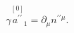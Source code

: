 \begin{equation}
\gamma \stackrel{[0]}{a^{\prime \prime }}_{1}=\partial _{\mu }n^{\prime
\prime \mu }.  \label{bf76}
\end{equation}

